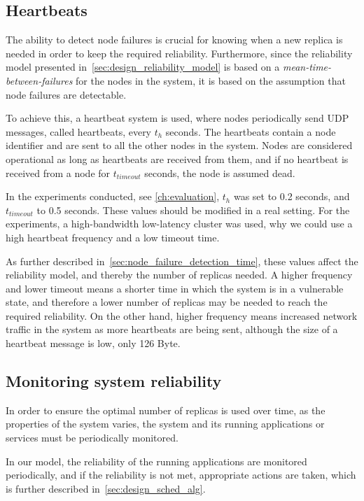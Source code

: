 \documentclass{cslthse-msc}
\begin{document}
\subsection{Heartbeats} \label{subsec:heartbeats}
The ability to detect node failures is crucial for knowing when a new replica is needed in order to keep the required reliability. Furthermore, since the reliability model presented in~\cref{sec:design_reliability_model} is based on a \emph{mean-time-between-failures} for the nodes in the system, it is based on the assumption that node failures are detectable. 

To achieve this, a heartbeat system is used, where nodes periodically send UDP messages, called heartbeats, every $t_h$ seconds. The heartbeats contain a node identifier and are sent to all the other nodes in the system. Nodes are considered operational as long as heartbeats are received from them, and if no heartbeat is received from a node for $t_{timeout}$ seconds, the node is assumed dead.

In the experiments conducted, see \cref{ch:evaluation}, $t_h$ was set to 0.2 seconds, and $t_{timeout}$ to 0.5 seconds. These values should be modified in a real setting. For the experiments, a high-bandwidth low-latency cluster was used, why we could use a high heartbeat frequency and a low timeout time.

As further described in~\cref{sec:node_failure_detection_time}, these values affect the reliability model, and thereby the number of replicas needed. A higher frequency and lower timeout means a shorter time in which the system is in a vulnerable state, and therefore a lower number of replicas may be needed to reach the required reliability. On the other hand, higher frequency means increased network traffic in the system as more heartbeats are being sent, although the size of a heartbeat message is low, only 126 Byte.

\subsection{Monitoring system reliability} \label{subsec:monitoring_system_rel}
In order to ensure the optimal number of replicas is used over time, as the properties of the system varies, the system and its running applications or services must be periodically monitored. 

In our model, the reliability of the running applications are monitored periodically, and if the reliability is not met, appropriate actions are taken, which is further described in~\cref{sec:design_sched_alg}.
\end{document}
